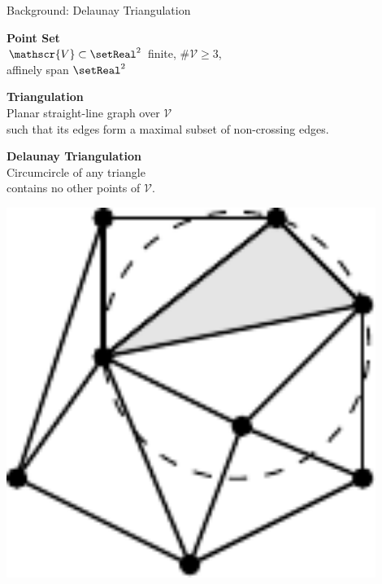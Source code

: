 \documentclass[aspectratio=169]{beamer}
\begin{document}
\begin{frame}{Background: Delaunay Triangulation}
  \begin{minipage}[c]{0.45\textwidth}
    \textbf{Point Set}\\
    $\mathscr{V}\subset\setReal^2$ finite, $\#\mathscr{V}\geq 3$, \\
    affinely span $\setReal^2$

    \bigskip

    \textbf{Triangulation}\\
    Planar straight-line graph over $\mathscr{V}$ \\
    such that its edges form a maximal subset of non-crossing edges.

    \bigskip

    \textbf{Delaunay Triangulation}\\
    Circumcircle of any triangle \\
    contains no other points of $\mathscr{V}$.
  \end{minipage}
  \hfill
  \begin{minipage}[c]{0.49\textwidth}
    \includegraphics[width=0.9\textwidth]{figures/triangulation-circumcircle.pdf}
  \end{minipage}
\end{frame}
\end{document}
